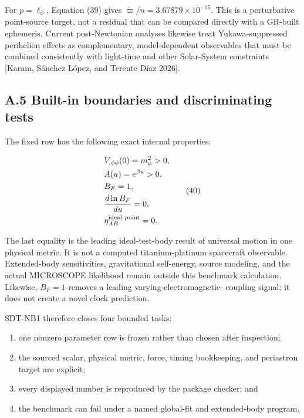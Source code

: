 \documentclass[
  american,
  11pt,
  letterpaper,
]{article}
\providecommand{\tightlist}{%
  \setlength{\itemsep}{0pt}\setlength{\parskip}{0pt}}
\begin{document}
For \(p=\ell_\phi\), Equation (39) gives \(\dot\varpi/n=3.67879\times10^{-15}\). This is a perturbative point-source target, not a residual that can be compared directly with a GR-built ephemeris. Current post-Newtonian analyses likewise treat Yukawa-suppressed perihelion effects as complementary, model-dependent observables that must be combined consistently with light-time and other Solar-System constraints {[}Karam, Sánchez López, and Terente Díaz 2026{]}.

\subsection{A.5 Built-in boundaries and discriminating tests}\label{a.5-built-in-boundaries-and-discriminating-tests}

The fixed row has the following exact internal properties:

\begin{equation}
\begin{aligned}
& V_{,\phi\phi}(0)=m_\phi^2>0, \\
& A(u)=e^{\beta u}>0, \\
& B_F=1, \\
& \frac{d\ln B_F}{du}=0, \\
& \eta_{AB}^{\rm ideal\ point}=0.
\end{aligned}
\tag{40}
\end{equation}

The last equality is the leading ideal-test-body result of universal motion in one physical metric. It is not a computed titanium-platinum spacecraft observable. Extended-body sensitivities, gravitational self-energy, source modeling, and the actual MICROSCOPE likelihood remain outside this benchmark calculation. Likewise, \(B_F=1\) removes a leading varying-electromagnetic- coupling signal; it does not create a novel clock prediction.

SDT-NB1 therefore closes four bounded tasks:

\begin{enumerate}
\def\labelenumi{\arabic{enumi}.}
\tightlist
\item
  one nonzero parameter row is frozen rather than chosen after inspection;
\item
  the sourced scalar, physical metric, force, timing bookkeeping, and periastron target are explicit;
\item
  every displayed number is reproduced by the package checker; and
\item
  the benchmark can fail under a named global-fit and extended-body program.
\end{enumerate}
\end{document}
